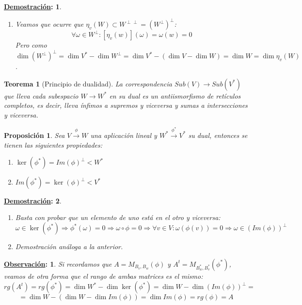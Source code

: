 \documentclass[10pt,a4paper,openright]{book}
\theoremstyle{break}
\newtheorem*{theo}{Teorema}
\newtheorem*{prop}{Proposición}
\newtheorem*{demo}{\underline{Demostración}:}
\newtheorem*{obs}{\underline{Observación}:}
\begin{document}
\begin{demo}
\begin{enumerate}
Como el primer espacio que empieza la cadena de contenidos y el último son el mismo subsespacio, la cadena de contenidos se vuelve cadena de igualdades, por lo que en particular:
$$(W_1\cap W_2)^{\perp\perp} = (W_1^\perp+W_2^\perp)^\perp\Rightarrow (W_1\cap W_2)^{\perp\perp\perp} = (W_1^\perp+W_2^\perp)^{\perp\perp}\Rightarrow$$
$$\Rightarrow \eta_v(W_1\cap W_2)^\perp = \eta_v(W_1^\perp+W_2^\perp)\Rightarrow (W_1\cap W_2)^\perp = W_1^\perp+W_2^\perp$$

\item Veamos que ocurre que $\eta_v(W)\subset W^{\perp\perp} = (W^\perp)^\perp$:
$$\forall \omega \in W^{\perp}: \left[\eta_v(w)\right](\omega) = \omega(w) = 0$$
Pero como $\dim (W^{\perp})^\perp = \dim V^*-\dim W^\perp =\dim V^*-( \dim V- \dim W)= \dim W = \dim \eta_v(W)$.
\end{enumerate}
\end{demo}

\begin{theo}[Principio de dualidad]
La correspondencia $Sub(V)\rightarrow Sub(V^*)$ que lleva cada subespacio $W\rightarrow W^*$ en su dual es un antiismorfismo de retículos completos, es decir, lleva ínfimos a supremos y viceversa y sumas a intersecciones y viceversa.
\end{theo}

\begin{prop}
Sea $V\xrightarrow{\phi} W$ una aplicación lineal y $W^*\xrightarrow{\phi^*}V^*$ su dual, entonces se tienen las siguientes propiedades:
\begin{enumerate}
\item $\ker(\phi^*)=Im(\phi)^\perp < W^*$
\item $Im(\phi^*)=\ker(\phi)^\perp < V^*$
\end{enumerate}
\end{prop}
\begin{demo}
\begin{enumerate}
\item Basta con probar que un elemento de uno está en el otro y viceversa:
$$\omega \in \ker(\phi^*)\Rightarrow \phi^*(\omega)=0\Rightarrow \omega \circ \phi = 0\Rightarrow \forall v\in V: \omega(\phi(v))=0\Rightarrow \omega \in (Im(\phi))^\perp$$
\item Demostración análoga a la anterior.
\end{enumerate}
\end{demo}

\begin{obs}
Si recordamos que $A=M_{B_v, B_w}(\phi)$ y $A^t=M_{B_w^*, B_v^*}(\phi^*)$, veamos de otra forma que el rango de ambas matrices es el mismo:
$$rg(A^t)=rg(\phi^*)=\dim W^*-\dim \ker(\phi^*)=\dim W- \dim (Im(\phi))^\perp=$$
$$=\dim W- (\dim W-\dim Im(\phi))=\dim Im(\phi)=rg(\phi)=A$$
\end{obs}
\end{document}
